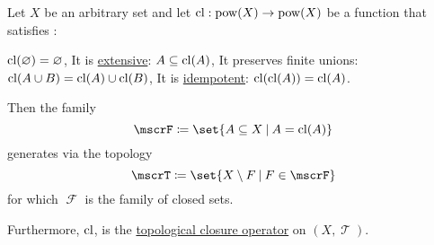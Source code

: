 \begin{proposition}\label{thm:topology_from_closure_operator}
  Let \( X \) be an arbitrary set and let \( \operatorname{cl}: \operatorname{pow}(X) \to \operatorname{pow}(X) \) be a function that satisfies :
  \begin{thmenum}
     \( \operatorname{cl}(\varnothing) = \varnothing \),
     It is \hyperref[def:extensive_function]{extensive}: \( A \subseteq \operatorname{cl}(A) \),
     It preserves finite unions: \( \operatorname{cl}(A \cup B) = \operatorname{cl}(A) \cup \operatorname{cl}(B) \),
     It is \hyperref[def:magma/idempotent]{idempotent}: \( \operatorname{cl}(\operatorname{cl}(A)) = \operatorname{cl}(A) \).
  \end{thmenum}

  Then the family
  \begin{equation*}
    \mscrF \coloneqq \set{ A \subseteq X \given A = \cl(A) }
  \end{equation*}
  generates via  the topology
  \begin{equation*}
    \mscrT \coloneqq \set{ X \setminus F \given F \in \mscrF }
  \end{equation*}
  for which \( \mscrF \) is the family of closed sets.

  Furthermore, \( \operatorname{cl} \), is the \hyperref[def:topological_closure_operator]{topological closure operator} on \( (X, \mscrT) \).
\end{proposition}
